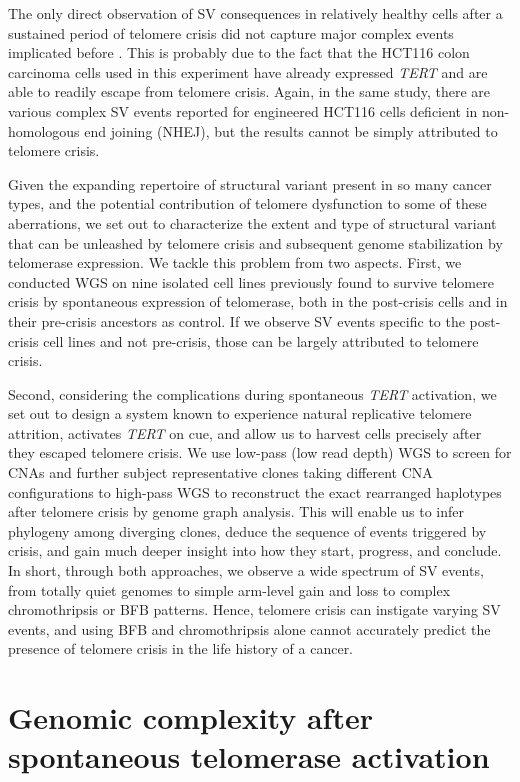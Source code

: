 \documentclass[phd,tocprelim]{cornell}
\begin{document}
The only direct observation of SV consequences in relatively healthy cells after a sustained period of telomere crisis did not capture major complex events implicated before \cite{Cleal2019-dk}. This is probably due to the fact that the HCT116 colon carcinoma cells used in this experiment have already expressed \textit{TERT} and are able to readily escape from telomere crisis. Again, in the same study, there are various complex SV events reported for engineered HCT116 cells deficient in non-homologous end joining (NHEJ), but the results cannot be simply attributed to telomere crisis.

Given the expanding repertoire of structural variant present in so many cancer types, and the potential contribution of telomere dysfunction to some of these aberrations, we set out to characterize the extent and type of structural variant that can be unleashed by telomere crisis and subsequent genome stabilization by telomerase expression. We tackle this problem from two aspects. First, we conducted WGS on nine isolated cell lines previously found to survive telomere crisis by spontaneous expression of telomerase, both in the post-crisis cells and in their pre-crisis ancestors as control. If we observe SV events specific to the post-crisis cell lines and not pre-crisis, those can be largely attributed to telomere crisis.

Second, considering the complications during spontaneous \textit{TERT} activation, we set out to design a system known to experience natural replicative telomere attrition, activates \textit{TERT} on cue, and allow us to harvest cells precisely after they escaped telomere crisis. We use low-pass (low read depth) WGS to screen for CNAs and further subject representative clones taking different CNA configurations to high-pass WGS to reconstruct the exact rearranged haplotypes after telomere crisis by genome graph analysis. This will enable us to infer phylogeny among diverging clones, deduce the sequence of events triggered by crisis, and gain much deeper insight into how they start, progress, and conclude. In short, through both approaches, we observe a wide spectrum of SV events, from totally quiet genomes to simple arm-level gain and loss to complex chromothripsis or BFB patterns. Hence, telomere crisis can instigate varying SV events, and using BFB and chromothripsis alone cannot accurately predict the presence of telomere crisis in the life history of a cancer.


\section{Genomic complexity after spontaneous telomerase activation}
\end{document}
